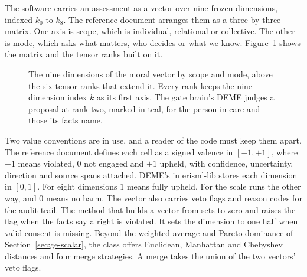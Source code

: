 The software carries an assessment as a vector over nine frozen dimensions, indexed $k_0$ to
$k_8$.
The reference document arranges them as a three-by-three matrix. One axis is scope, which is
individual, relational or collective. The other is mode, which asks what matters, who decides or
what we know. Figure~\ref{fig:ge-vector} shows the matrix and the tensor ranks built on it.

\begin{figure}[t]
\centering

\caption{The nine dimensions of the moral vector by scope and mode, above the six tensor ranks
that extend it. Every rank keeps the nine-dimension index $k$ as its first axis. The gate brain's
DEME judges a proposal at rank two, marked in teal, for the person in care and those its facts name.}
\label{fig:ge-vector}
\end{figure}

Two value conventions are in use, and a reader of the code must keep them apart. The reference
document defines each cell as a signed valence in $[-1,+1]$, where $-1$ means violated, $0$ not
engaged and $+1$ upheld, with confidence, uncertainty, direction and source spans attached.
DEME's  in erisml-lib stores each dimension in $[0,1]$. For eight dimensions $1$
means fully upheld. For  the scale runs the other way, and $0$ means no harm.
The vector also carries veto flags and reason codes for the audit trail. The method that builds a
vector from  sets  to zero and raises the flag
 when the facts say a right is violated. It sets the dimension to one half
when valid consent is missing.
Beyond the weighted average and Pareto dominance of Section~\ref{sec:ge-scalar}, the class offers
Euclidean, Manhattan and Chebyshev distances and four merge strategies. A merge takes the union of
the two vectors' veto flags.

